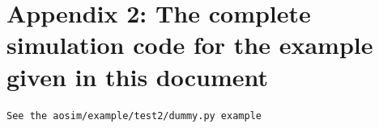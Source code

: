 \documentclass{article}
\begin{document}
\section*{Appendix 2:  The complete simulation code for the example
  given in this document}
\begin{verbatim}
See the aosim/example/test2/dummy.py example
\end{verbatim}

\pagebreak


\printindex
\end{document}
